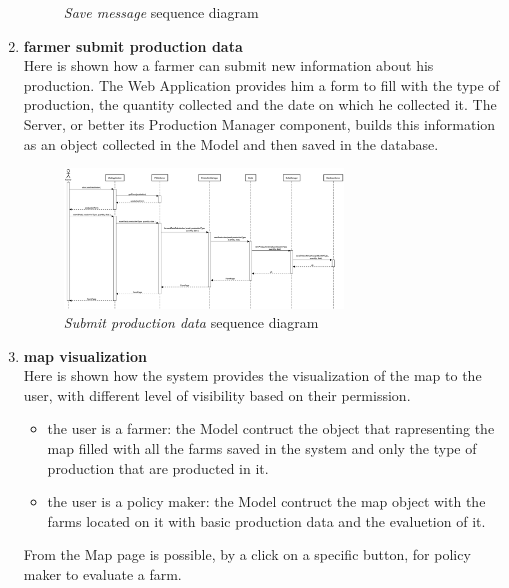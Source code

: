 \begin{enumerate}
\begin{figure}[H]
\begin{center}
        \caption{\emph{Save message} sequence diagram}
        \label{fig:sequence3}
        \end{center}
    \end{figure}
    \item \textbf{farmer submit production data}\\
    Here is shown how a farmer can submit new information about his production. The Web Application provides him a form to fill with the type of production, the quantity collected and the date on which he collected it. The Server, or better its Production Manager component, builds this information as an object collected in the Model and then saved in the database.
    \begin{figure}[H]
        \begin{center}
        \includegraphics[width=0.7\textwidth]{sequence/addData-2.png}
        \caption{\emph{Submit production data} sequence diagram}
        \label{fig:sequence4}
        \end{center}
    \end{figure}
    \item \textbf{map visualization}\\
    Here is shown how the system provides the visualization of the map to the user, with different level of visibility based on their permission.
        \begin{itemize}
            \item the user is a farmer: the Model contruct the object that rapresenting the map filled with all the farms saved in the system and only the type of production that are producted in it.
            \item the user is a policy maker: the Model contruct the map object with the farms located on it with basic production data and the evaluetion of it.
        \end{itemize}
    From the Map page is possible, by a click on a specific button, for policy maker to evaluate a farm.
    \begin{figure}[H]
        \begin{center}

\end{center}
\end{figure}
\end{enumerate}
